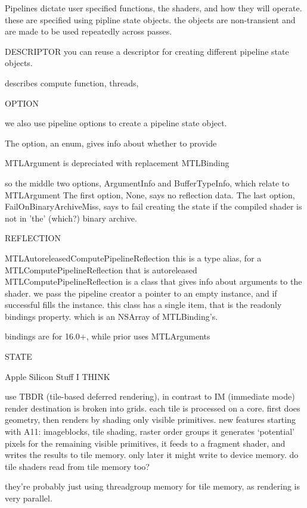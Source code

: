 

Pipelines dictate user specified functions, the shaders, and how they will operate.
these are specified using pipline state objects. the objects are non-transient and are made to be used repeatedly across passes.

DESCRIPTOR
you can reuse a descriptor for creating different pipeline state objects.

describes compute function, threads, 


OPTION

we also use pipeline options to create a pipeline state object.

The option, an enum, gives info about whether to provide 

MTLArgument is depreciated with replacement MTLBinding

so the middle two options, ArgumentInfo and BufferTypeInfo, which relate to MTLArgument
The first option, None, says no reflection data.
The last option, FailOnBinaryArchiveMiss, says to fail creating the state if the compiled shader is not in 'the' (which?) binary archive.

REFLECTION

MTLAutoreleasedComputePipelineReflection
this is a type alias, for a MTLComputePipelineReflection that is autoreleased
MTLComputePipelineReflection is a class that gives info about arguments to the shader. 
we pass the pipeline creator a pointer to an empty instance, and if successful fills the instance. 
this class has a single item, that is the readonly bindings property. which is an NSArray of MTLBinding's. 

bindings are for 16.0+, while prior uses MTLArguments

STATE



Apple Silicon Stuff I THINK

use TBDR (tile-based deferred rendering), in contrast to IM (immediate mode)
render destination is broken into grids. 
each tile is processed on a core.
first does geometry, then renders by shading only visible primitives.
new features starting with A11: imageblocks, tile shading, raster order groups
it generates `potential' pixels for the remaining visible primitives, it feeds to a fragment shader, and writes the results to tile memory. only later it might write to device memory. 
do tile shaders read from tile memory too? 

they're probably just using threadgroup memory for tile memory, as rendering is very parallel. 

